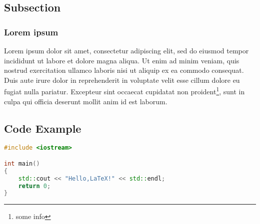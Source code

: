 \subsection{Subsection}

\subsubsection{Lorem ipsum}
\label{sec:sec2_label}
Lorem ipsum dolor sit amet, consectetur adipiscing elit, sed do eiusmod tempor incididunt ut labore et dolore magna aliqua.
Ut enim ad minim veniam, quis nostrud exercitation ullamco laboris nisi ut aliquip ex ea commodo consequat.
Duis aute irure dolor in reprehenderit in voluptate velit esse cillum dolore eu fugiat nulla pariatur.
Excepteur sint occaecat cupidatat non proident\footnote{some info}, sunt in culpa qui officia deserunt mollit anim id est laborum.

\subsection{Code Example}
\begin{lstlisting}[language=C++, caption={Source code}]
#include <iostream>

int main()
{
    std::cout << "Hello,LaTeX!" << std::endl;
    return 0;
}
\end{lstlisting}